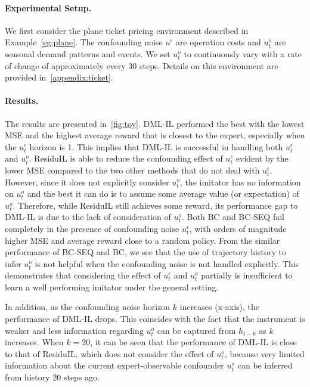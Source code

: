\paragraph{Experimental Setup.}
We first consider the plane ticket pricing environment described in Example~\ref{eg:plane}. The confounding noise $u^\epsilon$ are operation costs and $u^o_t$ are seasonal demand patterns and events. We set $u^o_t$ to continuously vary with a rate of change of approximately every 30 steps. Details on this environment are provided in~\cref{appendix:ticket}.
\vspace{-10pt}
\paragraph{Results.}
The results are presented in~\cref{fig:toy}. DML-IL performed the best with the lowest MSE and the highest average reward that is closest to the expert, especially when the $u^\epsilon_t$ horizon is 1. This implies that DML-IL is successful in handling both $u^\epsilon_t$ and $u^o_t$. ResiduIL is able to reduce the confounding effect of $u^\epsilon_t$ evident by the lower MSE compared to the two other methods that do not deal with $u^\epsilon_t$. However, since it does not explicitly consider $u^o_t$, the imitator has no information on $u^o_t$ and the best it can do is to assume some average value (or expectation) of $u^o_t$. Therefore, while ResiduIL still achieves some reward, its performance gap to DML-IL is due to the lack of consideration of $u^o_t$. Both BC and BC-SEQ fail completely in the presence of confounding noise $u^\epsilon_t$, with orders of magnitude higher MSE and average reward close to a random policy. From the similar performance of BC-SEQ and BC, we see that the use of trajectory history to infer $u^o_t$ is not helpful when the confounding noise is not handled explicitly. This demonstrates that considering the effect of $u^\epsilon_t$ and $u^o_t$ partially is insufficient to learn a well performing imitator under the general setting.

In addition, as the confounding noise horizon $k$ increases (x-axis), the performance of DML-IL drops. This coincides with the fact that the instrument is weaker and less information regarding $u^o_t$ can be captured from $h_{t-k}$ as $k$ increases. When $k=20$, it can be seen that the performance of DML-IL is close to that of ResiduIL, which does not consider the effect of $u^o_t$, because very limited information about the current expert-observable confounder $u^o_t$ can be inferred from history 20 steps ago.



